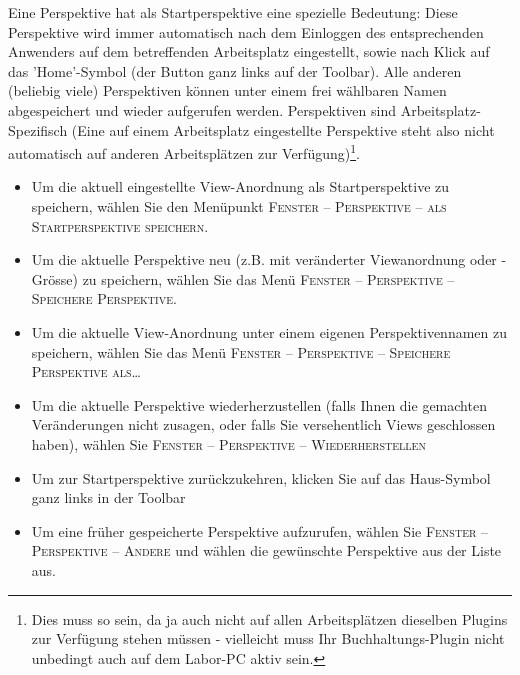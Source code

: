 Eine Perspektive hat als \glqq Startperspektive\grqq{} eine spezielle Bedeutung:
Diese Perspektive wird immer automatisch nach dem Einloggen des entsprechenden
Anwenders auf dem betreffenden Arbeitsplatz eingestellt, sowie nach Klick auf das
'Home'-Symbol (der Button ganz links auf der Toolbar). Alle anderen (beliebig
viele) Perspektiven können unter einem frei wählbaren Namen abgespeichert und
wieder aufgerufen werden. Perspektiven sind Arbeitsplatz-Spezifisch (Eine auf
einem Arbeitsplatz eingestellte Perspektive steht also nicht automatisch auf
anderen Arbeitsplätzen zur Verfügung)\footnote{Dies muss so sein, da ja auch
nicht auf allen Arbeitsplätzen dieselben Plugins zur Verfügung stehen müssen -
vielleicht muss Ihr Buchhaltungs-Plugin nicht unbedingt auch auf dem Labor-PC
aktiv sein.}.

\begin{itemize}
\item Um die aktuell eingestellte View-Anordnung als Startperspektive zu
speichern,
wählen Sie den Menüpunkt \textsc{Fenster -- Perspektive -- als Startperspektive
speichern}.

\item Um die aktuelle Perspektive neu (z.B. mit veränderter Viewanordnung oder
-Grösse) zu speichern, wählen Sie das Menü \textsc{Fenster -- Perspektive --
Speichere Perspektive}.

\item Um die aktuelle View-Anordnung unter einem eigenen Perspektivennamen
zu speichern, wählen Sie das  Menü \textsc{Fenster -- Perspektive -- Speichere Perspektive als\ldots}

\item Um die aktuelle Perspektive wiederherzustellen (falls Ihnen die gemachten
Veränderungen nicht zusagen, oder falls Sie versehentlich Views geschlossen
haben), wählen Sie \textsc{Fenster -- Perspektive -- Wiederherstellen}

\item Um zur Startperspektive zurückzukehren, klicken Sie auf das Haus-Symbol
ganz links in der Toolbar
\item Um eine früher gespeicherte Perspektive aufzurufen, wählen Sie
\textsc{Fenster -- Perspektive -- Andere} und wählen die gewünschte Perspektive
aus der Liste aus.

\end{itemize}
